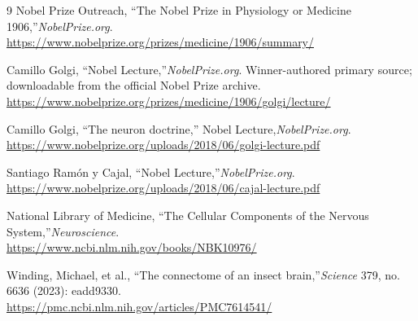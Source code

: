 \begin{thebibliography}{9}
Nobel Prize Outreach, ``The Nobel Prize in Physiology or Medicine 1906,''\emph{NobelPrize.org}.\\
\url{https://www.nobelprize.org/prizes/medicine/1906/summary/}

Camillo Golgi, ``Nobel Lecture,''\emph{NobelPrize.org}. Winner-authored primary source; downloadable from the official Nobel Prize archive.\\
\url{https://www.nobelprize.org/prizes/medicine/1906/golgi/lecture/}

Camillo Golgi, ``The neuron doctrine,'' Nobel Lecture,\emph{NobelPrize.org}.\\
\url{https://www.nobelprize.org/uploads/2018/06/golgi-lecture.pdf}

Santiago Ram\'on y Cajal, ``Nobel Lecture,''\emph{NobelPrize.org}.\\
\url{https://www.nobelprize.org/uploads/2018/06/cajal-lecture.pdf}

National Library of Medicine, ``The Cellular Components of the Nervous System,''\emph{Neuroscience}.\\
\url{https://www.ncbi.nlm.nih.gov/books/NBK10976/}

Winding, Michael, et al., ``The connectome of an insect brain,''\emph{Science} 379, no. 6636 (2023): eadd9330.\\
\url{https://pmc.ncbi.nlm.nih.gov/articles/PMC7614541/}
\end{thebibliography}
